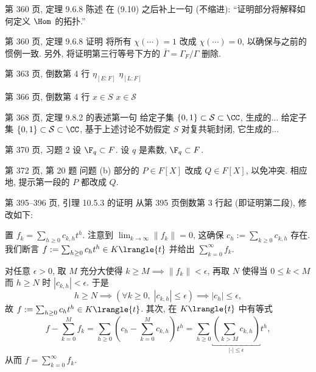 \documentclass{AJerrata}
\begin{document}
\begin{Errata}
        \item[第 360 页, 定理 9.6.8 陈述]
        在 (9.10) 之后补上一句 (不缩进): ``证明部分将解释如何定义 $\Hom$ 的拓扑.'' 
        
        \item[第 360 页, 定理 9.6.8 证明]
        将所有 $\chi(\cdots) = 1$ 改成 $\chi(\cdots) = 0$, 以确保与之前的惯例一致. 另外, 将证明第三行等号下方的 $\bar{\Gamma} = \Gamma_F/\Gamma$ 删除.
        
   		\item[第 363 页, 倒数第 4 行]
        \Orig $\eta_{[E:F]}$
        \Corr $\eta_{[L:F]}$
		
		\item[第 366 页, 倒数第 4 行]
		\Orig $x \in S$
		\Corr $x \in \mathcal{S}$
        
        \item[第 368 页, 定理 9.8.2 的表述第一句]
        \Orig 给定子集 $\{0, 1\} \subset \mathcal{S} \subset \CC$, 生成的...
        \Corr 给定子集 $\{0, 1\} \subset \mathcal{S} \subset \CC$, 基于上述讨论不妨假定 $S$ 对复共轭封闭, 它生成的...
        
        \item[第 370 页, 习题 2]
        \Orig 设 $\F_q \subset F$.
        \Corr 设 $q$ 是素数, $\F_q \subset F$.
        
   		\item[第 372 页, 第 20 题]
        问题 (b) 部分的 $P \in F[X]$ 改成 $Q \in F[X]$, 以免冲突. 相应地, 提示第一段的 $P$ 都改成 $Q$.
        
        \item[第 395--396 页, 引理 10.5.3 的证明]
        从第 395 页倒数第 3 行起 (即证明第二段), 修改如下:

		置 $f_k = \sum_{h \geq 0} c_{k,h} t^h$. 注意到 $\lim_{k \to \infty} \|f_k\| = 0$, 这确保 $c_h := \sum_{k \geq 0} c_{k,h}$ 存在. 我们断言 $f := \sum_{h \geq 0} c_h t^h \in K\lrangle{t}$ 并给出 $\sum_{k=0}^\infty f_k$.
        
        对任意 $\epsilon > 0$, 取 $M$ 充分大使得 $k \geq M \implies \|f_k\| < \epsilon$, 再取 $N$ 使得当 $0 \leq k < M$ 而 $h \geq N$ 时 $|c_{k,h}| < \epsilon$. 于是
        \[ h \geq N \implies \left( \forall k \geq 0, \; |c_{k,h}| \leq \epsilon \right) \implies |c_h| \leq \epsilon, \]
        故 $f := \sum_{h \geq 0} c_h t^h \in K\lrangle{t}$. 其次, 在 $K\lrangle{t}$ 中有等式
        \[ f - \sum_{k=0}^M f_k = \sum_{h \geq 0} \left( c_h - \sum_{k=0}^M c_{k,h} \right) t^h = \sum_{h \geq 0} \underbracket{ \left( \sum_{k > M} c_{k,h} \right)}_{|\cdot| \leq \epsilon} t^h , \]
        从而 $f = \sum_{k=0}^\infty f_k$.
        

\end{Errata}
\end{document}
